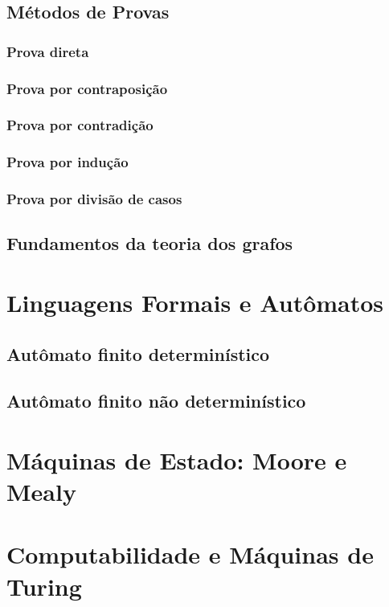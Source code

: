 \documentclass[a4paper,12pt]{article}
\begin{document}
\subsection{Métodos de Provas} %


\subsubsection{Prova direta}
\subsubsection{Prova por contraposição}
\subsubsection{Prova por contradição}
\subsubsection{Prova por indução}
\subsubsection{Prova por divisão de casos}


\subsection{Fundamentos da teoria dos grafos} %


\section{Linguagens Formais e Autômatos}

\subsection{Autômato finito determinístico}
\subsection{Autômato finito não determinístico}

\section{Máquinas de Estado: Moore e Mealy}

\section{Computabilidade e Máquinas de Turing}
\end{document}
